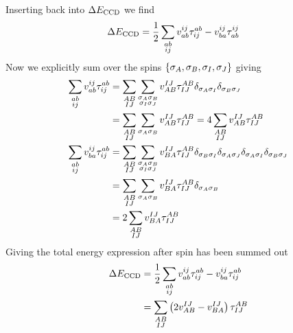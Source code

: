 Inserting back into $\Delta E_{\text{CCD}}$ we find
\begin{align*}
    \Delta E_{\text{CCD}}  &= \frac{1}{2} \sum_{\substack{ab\\ij}}v^{ij}_{ab} \tau^{ab}_{ij} - v^{ij}_{ba}\tau^{ij}_{ab}
\end{align*}
Now we explicitly sum over the spins $\{\sigma_A,\sigma_B,\sigma_I,\sigma_J\}$ giving
\begin{align*}
    \sum_{\substack{ab\\ij}}v^{ij}_{ab} \tau^{ab}_{ij} &= \sum_{\substack{AB\\IJ}}\sum_{\substack{\sigma_A \sigma_B\\\sigma_I \sigma_J}} v^{IJ}_{AB}\tau^{AB}_{IJ} \delta_{\sigma_A \sigma_I} \delta_{\sigma_B \sigma_J} \\
    &= \sum_{\substack{AB\\IJ}}\sum_{\substack{\sigma_A \sigma_B}} v^{IJ}_{AB}\tau^{AB}_{IJ} = 4 \sum_{\substack{AB\\IJ}} v^{IJ}_{AB}\tau^{AB}_{IJ} \\
    \sum_{\substack{ab\\ij}}v^{ij}_{ba} \tau^{ab}_{ij} &= \sum_{\substack{AB\\IJ}}\sum_{\substack{\sigma_A \sigma_B\\\sigma_I \sigma_J}} v^{IJ}_{BA}\tau^{AB}_{IJ} \delta_{\sigma_B \sigma_I} \delta_{ \sigma_A \sigma_J} \delta_{\sigma_A \sigma_I} \delta_{ \sigma_B \sigma_J} \\
    &= \sum_{\substack{A B\\I J}} \sum_{\substack{\sigma_A \sigma_B}} v^{IJ}_{BA}\tau^{AB}_{IJ} \delta_{\sigma_A \sigma_B} \\
    &= 2\sum_{\substack{A B\\I J}}  v^{IJ}_{BA}\tau^{AB}_{IJ}
\end{align*}
Giving the total energy expression after spin has been summed out
\begin{align*}
    \Delta E_{\text{CCD}}  &= \frac{1}{2}\sum_{\substack{ab\\ij}} v^{ij}_{ab} \tau^{ab}_{ij} - v^{ij}_{ba} \tau^{ab}_{ij} \\
    &= \sum_{\substack{AB\\IJ}} \left(2 v^{IJ}_{AB} - v^{IJ}_{BA}\right) \tau^{AB}_{IJ}
\end{align*}